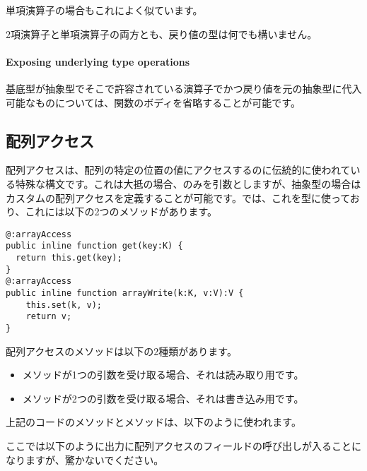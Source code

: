 単項演算子の場合もこれによく似ています。


2項演算子と単項演算子の両方とも、戻り値の型は何でも構いません。

\paragraph{Exposing underlying type operations}

基底型が抽象型でそこで許容されている演算子でかつ戻り値を元の抽象型に代入可能なものについては、関数のボディを省略することが可能です。



\subsection{配列アクセス}
\label{types-abstract-array-access}

配列アクセスは、配列の特定の位置の値にアクセスするのに伝統的に使われている特殊な構文です。これは大抵の場合、のみを引数としますが、抽象型の場合はカスタムの配列アクセスを定義することが可能です。では、これを型に使っており、これには以下の2つのメソッドがあります。

\begin{lstlisting}
@:arrayAccess
public inline function get(key:K) {
  return this.get(key);
}
@:arrayAccess
public inline function arrayWrite(k:K, v:V):V {
	this.set(k, v);
	return v;
}
\end{lstlisting}

配列アクセスのメソッドは以下の2種類があります。

\begin{itemize}
	\item {}メソッドが1つの引数を受け取る場合、それは読み取り用です。
	\item {}メソッドが2つの引数を受け取る場合、それは書き込み用です。
\end{itemize}

上記のコードのメソッドとメソッドは、以下のように使われます。


ここでは以下のように出力に配列アクセスのフィールドの呼び出しが入ることになりますが、驚かないでください。

